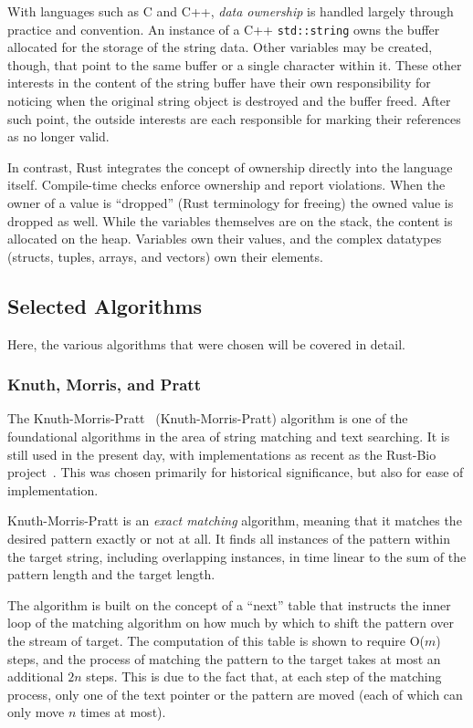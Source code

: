 With languages such as C and C++, \textit{data ownership} is handled largely through practice and convention. An instance of a C++ \texttt{std::string} owns the buffer allocated for the storage of the string data. Other variables may be created, though, that point to the same buffer or a single character within it. These other interests in the content of the string buffer have their own responsibility for noticing when the original string object is destroyed and the buffer freed. After such point, the outside interests are each responsible for marking their references as no longer valid.

In contrast, Rust integrates the concept of ownership directly into the language itself. Compile-time checks enforce ownership and report violations. When the owner of a value is ``dropped'' (Rust terminology for freeing) the owned value is dropped as well. While the variables themselves are on the stack, the content is allocated on the heap. Variables own their values, and the complex datatypes (structs, tuples, arrays, and vectors) own their elements.

\subsection{Selected Algorithms}

Here, the various algorithms that were chosen will be covered in detail.

\subsubsection{Knuth, Morris, and Pratt}

The Knuth-Morris-Pratt~\cite{knuth.morris.pratt.1977} (Knuth-Morris-Pratt) algorithm is one of the foundational algorithms in the area of string matching and text searching. It is still used in the present day, with implementations as recent as the Rust-Bio project~\cite{rust.bio.2015}. This was chosen primarily for historical significance, but also for ease of implementation.

Knuth-Morris-Pratt is an \textit{exact matching} algorithm, meaning that it matches the desired pattern exactly or not at all. It finds all instances of the pattern within the target string, including overlapping instances, in time linear to the sum of the pattern length and the target length.

The algorithm is built on the concept of a ``next'' table that instructs the inner loop of the matching algorithm on how much by which to shift the pattern over the stream of target. The computation of this table is shown to require O($m$) steps, and the process of matching the pattern to the target takes at most an additional $2n$ steps. This is due to the fact that, at each step of the matching process, only one of the text pointer or the pattern are moved (each of which can only move $n$ times at most).

